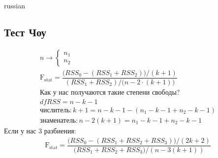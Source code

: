 \documentclass{article}
\begin{document}
\begin{otherlanguage*}{russian}
\subsection*{Тест Чоу}
\begin{align*}
n \rightarrow \begin{cases} n_1 \\ n_2 \end{cases} \\
\text{F}_{\text{stat}} = \dfrac{\Big(RSS_0 - (RSS_1 + RSS_2) \Big)/ (k + 1)}{(RSS_1 + RSS_2) / \Big( n - 2 \cdot (k + 1) \Big)} \\
\text{Как у нас получаются такие степени свободы?} \\ 
df RSS = n - k - 1  \\
\text{числитель}: k + 1 = n - k - 1 - (n_1 - k - 1 + n_2 - k - 1 ) \\
\text{знаменатель}: n - 2 (k + 1) = n_1 - k - 1 + n_2 - k - 1 
\end{align*}
Если у нас 3 разбиения: 
\begin{align*}
\text{F}_{\text{stat}} = \dfrac{\Big( RSS_0 - (RSS_1 + RSS_2 + RSS_3) \Big) / (2k +2)}{\Big( RSS_1 + RSS_2 + RSS_3 \Big) / (n - 3 (k + 1))}
\end{align*}

\end{otherlanguage*}
\end{document}
